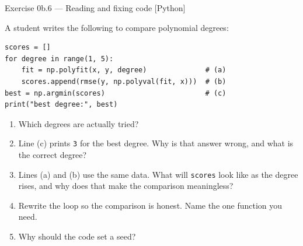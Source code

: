 \documentclass[aspectratio=169,11pt]{beamer}
\begin{document}
\begin{frame}[fragile]{Exercise 0b.6 --- Reading and fixing code [Python]}
  \begin{exercise}
    \scriptsize
    A student writes the following to compare polynomial degrees:
\begin{lstlisting}
scores = []
for degree in range(1, 5):
    fit = np.polyfit(x, y, degree)              # (a)
    scores.append(rmse(y, np.polyval(fit, x)))  # (b)
best = np.argmin(scores)                        # (c)
print("best degree:", best)
\end{lstlisting}
    \begin{enumerate}
      \item Which degrees are actually tried?
      \item Line (c) prints \texttt{3} for the best degree. Why is that
            answer wrong, and what is the correct degree?
      \item Lines (a) and (b) use the same data. What will \texttt{scores}
            look like as the degree rises, and why does that make the
            comparison meaningless?
      \item Rewrite the loop so the comparison is honest. Name the one
            function you need.
      \item Why should the code set a seed?
    \end{enumerate}
  \end{exercise}
\end{frame}
\end{document}
